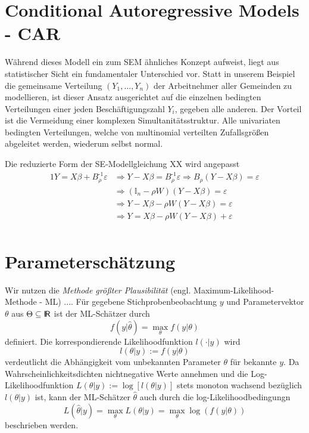 \section{Conditional Autoregressive Models - CAR}

Während dieses Modell ein zum SEM ähnliches Konzept aufweist, liegt aus statistischer 
Sicht ein fundamentaler Unterschied vor. Statt in unserem Beispiel die gemeinsame 
Verteilung $(Y_{1},\ldots,Y_{n})$ der Arbeitnehmer aller Gemeinden zu modellieren, ist 
dieser Ansatz ausgerichtet auf die einzelnen bedingten Verteilungen einer jeden 
Beschäftigungszahl $Y_{i}$, gegeben alle anderen. Der Vorteil ist die Vermeidung einer 
komplexen Simultanitätsstruktur. Alle univariaten bedingten Verteilungen, welche von 
multinomial verteilten Zufallsgrößen abgeleitet werden, wiederum selbst normal.


Die reduzierte Form der SE-Modellgleichung XX wird angepasst
\begin{alignat*}{1}
    Y=X \beta + B_{\rho}^{\text{-1}} \varepsilon & \Rightarrow Y - X \beta = B_{\rho}^{\text{-1}} \varepsilon 
    \Rightarrow B_{\rho} (Y-X \beta) = \varepsilon \\
    & \Rightarrow  (\mathds{I}_{n} - \rho W)(Y-X \beta) = \varepsilon \\
    & \Rightarrow  Y - X \beta - \rho W (Y-X \beta) = \varepsilon \\
    & \Rightarrow  Y = X \beta - \rho W (Y-X \beta) + \varepsilon \\
\end{alignat*}



\section{Parameterschätzung}
Wir nutzen die \emph{Methode größter Plausibilität} (engl. Maximum-Likelihood-Methode - ML) ....
Für gegebene Stichprobenbeobachtung $y$ und Parametervektor $\theta$ aus $ \Theta \subseteq {\sf I\kern-0.14emR}$ ist 
der ML-Schätzer durch
\begin{equation*}
    f(y|\hat{\theta})=\max_{\theta} f(y|\theta)
\end{equation*}
definiert. Die korrespondierende Likelihoodfunktion $l(\cdot|y)$ wird 
\begin{equation*}
    l(\theta|y) := f(y|\theta)
\end{equation*}
verdeutlicht die Abhängigkeit vom unbekannten Parameter $\theta$ für bekannte $y$.
Da Wahrscheinlichkeitsdichten nichtnegative Werte annehmen und die Log-Likelihoodfunktion 
$L(\theta|y) := \operatorname{log} \left[ l(\theta|y) \right]$ stets monoton wachsend bezüglich $l(\theta|y)$ 
ist, kann der ML-Schätzer $\hat{\theta}$ auch durch die log-Likelihoodbedingungn
\begin{equation*}
    L(\hat{\theta}|y)=\max_{\theta} L(\theta|y) =\max_{\theta} \operatorname{log} (f(y|\theta))
\end{equation*}
beschrieben werden.

